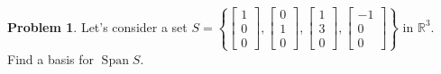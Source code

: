 \documentclass[12pt,letterpaper]{book}
\numberwithin{equation}{section}
\theoremstyle{definition}
\newtheorem{problem}[thm]{\textbf{Problem}}
\newcommand{\Span}{\operatorname{Span}}
\begin{document}
\begin{problem}\label{sst example} Let's consider a set $S=\left\{\left[\begin{array}{r} 1 \\ 0 \\ 0
\end{array}\right],\left[\begin{array}{r} 0 \\ 1 \\ 0
\end{array}\right],\left[\begin{array}{r} 1 \\ 3 \\ 0
\end{array}\right],\left[\begin{array}{r} -1 \\ 0 \\ 0
\end{array}\right]\right\}$ in $\mathbb{R}^3$. Find a basis for $\Span S$.
\end{problem}
\end{document}
